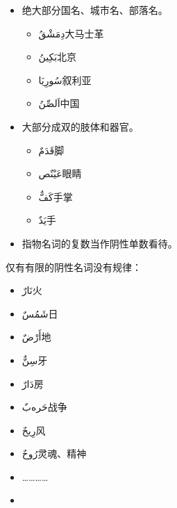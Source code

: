 \begin{itemize}
    \item 绝大部分国名、城市名、部落名。
    \begin{multicols}{2}
        \begin{itemize}
            \item \ac{دِمَشْقُ}{大马士革}
            \item \ac{بَكِينُ}{北京}
            \item \ac{سُورِيَا}{叙利亚}
            \item \ac{اَلصِّنُ}{中国}
        \end{itemize}
    \end{multicols}
    
    \item 大部分成双的肢体和器官。
    \begin{multicols}{2}
        \begin{itemize}
            \item \ac{قَدَمٌ}{脚}
            \item \ac{عَيْنٌص}{眼睛}
            \item \ac{كَفٌّ}{手掌}
            \item \ac{يَدٌ}{手}
        \end{itemize}
    \end{multicols}
    
    \item 指物名词的复数当作阴性单数看待。
\end{itemize}

仅有有限的阴性名词没有规律：

\begin{multicols}{2}
    \begin{itemize}
        \item \ac{نَارٌ}{火}
        \item \ac{شَمُسٌ}{日}
        \item \ac{أَرْضٌ}{地}
        \item \ac{سِنٌّ}{牙}
        \item \ac{دَارٌ}{房}
        \item \ac{حَرەبٌ}{战争}
        \item \ac{رِيحٌ}{风}
        \item \ac{رُوحٌ}{灵魂、精神}
        \item …………
        \item[]
    \end{itemize}    
\end{multicols}

